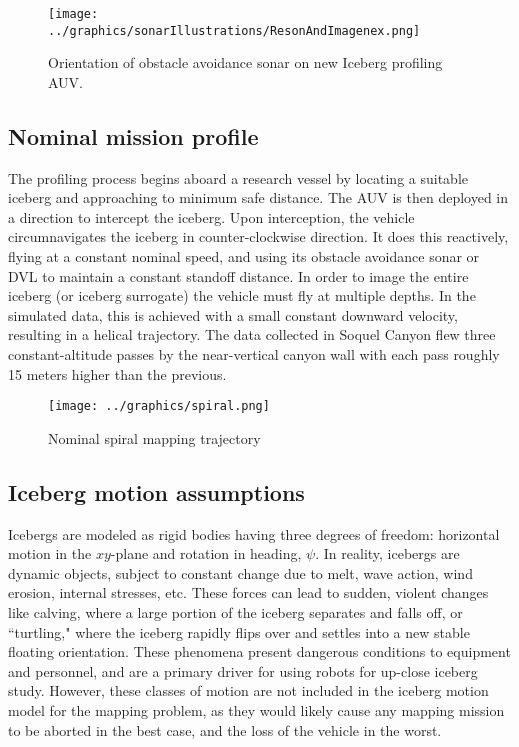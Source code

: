 \begin{figure}[htb]
   \centering
   \texttt{[image: ../graphics/sonarIllustrations/ResonAndImagenex.png]} %
   \caption{Orientation of obstacle avoidance sonar on new Iceberg profiling AUV. }
   \label{fig:ObstandMulti}
\end{figure}

\subsection{Nominal mission profile}

The profiling process begins aboard a research vessel by locating a suitable iceberg and approaching to minimum safe distance. The AUV is then deployed in a direction to intercept the iceberg. Upon interception, the vehicle circumnavigates the iceberg in counter-clockwise direction. It does this reactively, flying at a constant nominal speed, and using its obstacle avoidance sonar or DVL to maintain a constant standoff distance. In order to image the entire iceberg (or iceberg surrogate) the vehicle must fly at multiple depths. In the simulated data, this is achieved with a small constant downward velocity, resulting in a helical trajectory. The data collected in Soquel Canyon flew three constant-altitude passes by the near-vertical canyon wall with each pass roughly 15 meters higher than the previous. 

\begin{figure}[htb]
   \centering
   \texttt{[image: ../graphics/spiral.png]} %
   \caption{Nominal spiral mapping trajectory }
   \label{fig:NominalProfile}
\end{figure}

\subsection{Iceberg motion assumptions}

Icebergs are modeled as rigid bodies having three degrees of freedom: horizontal motion in the $xy$-plane and rotation in heading, $\psi$. In reality, icebergs are dynamic objects, subject to constant change due to melt, wave action, wind erosion, internal stresses, etc. These forces can lead to sudden, violent changes like calving, where a large portion of the iceberg separates and falls off, or ``turtling," where the iceberg rapidly flips over and settles into a new stable floating orientation. These phenomena present dangerous conditions to equipment and personnel, and are a primary driver for using robots for up-close iceberg study.  However, these classes of motion are not included in the iceberg motion model for the mapping problem, as they would likely cause any mapping mission to be aborted in the best case, and the loss of the vehicle in the worst.

